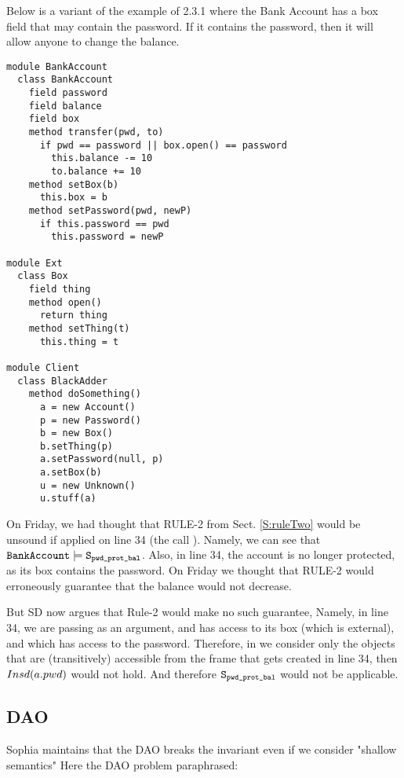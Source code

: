 Below is a variant of the example of 2.3.1 where the Bank Account has a box field 
that may contain the password. If it contains the password, then it will allow anyone to change the balance.

\begin{lstlisting}[language=chainmail, mathescape=true, frame=lines]
module BankAccount
  class BankAccount
    field password
    field balance
    field box
    method transfer(pwd, to)
      if pwd == password || box.open() == password
        this.balance -= 10
        to.balance += 10
    method setBox(b)
      this.box = b
    method setPassword(pwd, newP)
      if this.password == pwd
        this.password = newP
      
module Ext
  class Box
    field thing
    method open()
      return thing
    method setThing(t)
      this.thing = t
    
module Client
  class BlackAdder
    method doSomething()
      a = new Account()
      p = new Password()
      b = new Box()
      b.setThing(p)
      a.setPassword(null, p)
      a.setBox(b)
      u = new Unknown()
      u.stuff(a)   
\end{lstlisting}

On Friday, we had thought that RULE-2 from Sect.  \ref{S:ruleTwo} would be unsound if applied on line 34 (the call ).
Namely, we can see that ${\texttt{BankAccount}} \models {\texttt{S}}_{{\texttt{{pwd\_prot\_bal}}}}$.  
Also, in line 34, the account is no longer protected, as its box contains the password. On Friday we thought that RULE-2 would 
erroneously guarantee that the balance would not decrease.

\SP But SD now argues that Rule-2 would make no such guarantee, Namely, in line 34, we are passing  as an argument, and  has access to its box (which is external), and which has access to the password. 
Therefore, in we consider only the objects that are (transitively) accessible from the frame that gets created 
in line 34, then $Insd(a.pwd)$ would not hold. And therefore ${\texttt{S}}_{{\texttt{{pwd\_prot\_bal}}}}$ would not be applicable. 



\subsection{DAO}
\label{s:DAO}

\SP Sophia maintains that the DAO breaks the invariant even if we consider "shallow semantics"
Here the DAO problem paraphrased: 

